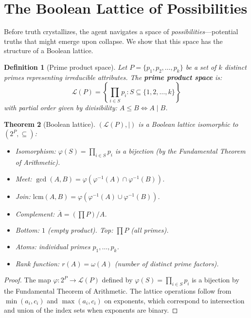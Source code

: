 \documentclass[11pt,a4paper]{article}
\newtheorem{theorem}{Theorem}
\newtheorem{definition}[theorem]{Definition}
\begin{document}
\section{The Boolean Lattice of Possibilities}
\label{sec:lattice}

Before truth crystallizes, the agent navigates a space of
\emph{possibilities}---potential truths that might emerge upon collapse.
We show that this space has the structure of a Boolean lattice.

\begin{definition}[Prime product space]
\label{def:pps}
Let $P = \{p_1, p_2, \ldots, p_k\}$ be a set of $k$ distinct primes
representing irreducible attributes. The \textbf{prime product space} is:
\begin{equation}
\mathcal{L}(P) = \left\{ \prod_{i \in S} p_i
  : S \subseteq \{1, 2, \ldots, k\} \right\}
\end{equation}
with partial order given by divisibility: $A \leq B \iff A \mid B$.
\end{definition}

\begin{theorem}[Boolean lattice]
\label{thm:lattice}
$(\mathcal{L}(P), \mid)$ is a Boolean lattice isomorphic to
$(2^P, \subseteq)$:
\begin{itemize}[nosep]
\item \emph{Isomorphism}: $\varphi(S) = \prod_{i \in S} p_i$ is a
  bijection (by the Fundamental Theorem of Arithmetic).
\item \emph{Meet}: $\gcd(A, B) = \varphi(\varphi^{-1}(A) \cap \varphi^{-1}(B))$.
\item \emph{Join}: $\mathrm{lcm}(A, B) = \varphi(\varphi^{-1}(A) \cup \varphi^{-1}(B))$.
\item \emph{Complement}: $\overline{A} = (\prod P) / A$.
\item \emph{Bottom}: $1$ (empty product). \emph{Top}: $\prod P$ (all primes).
\item \emph{Atoms}: individual primes $p_1, \ldots, p_k$.
\item \emph{Rank function}: $r(A) = \omega(A)$ (number of distinct prime
  factors).
\end{itemize}
\end{theorem}

\begin{proof}
The map $\varphi: 2^P \to \mathcal{L}(P)$ defined by
$\varphi(S) = \prod_{i \in S} p_i$ is a bijection by the Fundamental
Theorem of Arithmetic. The lattice operations follow from
$\min(a_i, c_i)$ and $\max(a_i, c_i)$ on exponents, which correspond to
intersection and union of the index sets when exponents are binary.
\end{proof}
\end{document}
